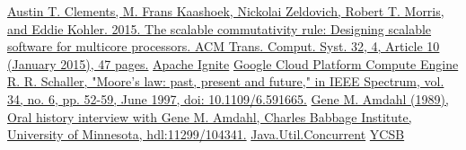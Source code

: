 \documentclass[conference]{IEEEtran}
\begin{document}
\begin{thebibliography}{00}
 \href{https://dl.acm.org/doi/10.1145/2699681}{Austin T. Clements, M. Frans Kaashoek, Nickolai Zeldovich, Robert T. Morris, and Eddie Kohler. 2015. The scalable commutativity rule: Designing scalable software for multicore processors. ACM Trans. Comput. Syst. 32, 4, Article 10 (January 2015), 47 pages.}
 \href{https://ignite.apache.org/docs/latest/}{Apache Ignite}
 \href{https://cloud.google.com/compute/docs}{Google Cloud Platform Compute Engine}
 \href{https://ieeexplore.ieee.org/document/591665}{R. R. Schaller, "Moore's law: past, present and future," in IEEE Spectrum, vol. 34, no. 6, pp. 52-59, June 1997, doi: 10.1109/6.591665.}
 \href{https://conservancy.umn.edu/handle/11299/104341}{Gene M. Amdahl (1989), Oral history interview with Gene M. Amdahl, Charles Babbage Institute, University of Minnesota, hdl:11299/104341.}
 \href{https://docs.oracle.com/javase/8/docs/api/index.html?java/util/concurrent/package-summary.html}{Java.Util.Concurrent}
 \href{https://ycsb.site}{YCSB}

\end{thebibliography}

\vspace{12pt}
\end{document}
